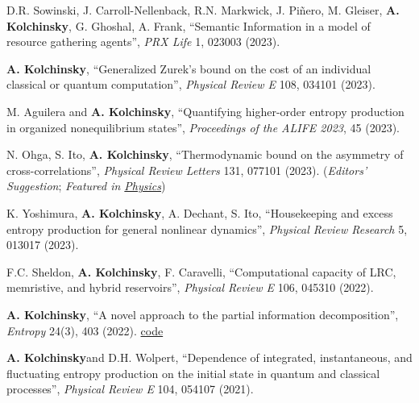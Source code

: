 D.R. Sowinski, J. Carroll-Nellenback, R.N. Markwick, J. Piñero, M. Gleiser, \textbf{A. Kolchinsky}, G. Ghoshal, A. Frank, ``Semantic Information in a model of resource gathering agents'', \emph{PRX Life} 1, 023003 (2023).  

\textbf{A. Kolchinsky}\CA, ``Generalized Zurek's bound on the cost of an individual classical or quantum computation'', \emph{Physical Review E} 108, 034101 (2023).  

M. Aguilera and \textbf{A. Kolchinsky}, ``Quantifying higher-order entropy production in organized nonequilibrium states'', \emph{Proceedings of the ALIFE 2023}, 45 (2023).  

N. Ohga, S. Ito, \textbf{A. Kolchinsky}, ``Thermodynamic bound on the asymmetry of cross-correlations'', \emph{Physical Review Letters} 131, 077101 (2023).   (\emph{Editors' Suggestion}; \emph{Featured in \href{https://physics.aps.org/articles/v16/142}{Physics}})

K. Yoshimura, \textbf{A. Kolchinsky}, A. Dechant, S. Ito, ``Housekeeping and excess entropy production for general nonlinear dynamics'', \emph{Physical Review Research}  5, 013017 (2023).  

F.C. Sheldon, \textbf{A. Kolchinsky}, F. Caravelli, ``Computational capacity of LRC, memristive, and hybrid reservoirs'', \emph{Physical Review E} 106, 045310 (2022).  

\textbf{A. Kolchinsky}, ``A novel approach to the partial information decomposition'', \emph{Entropy} 24(3), 403 (2022).  \href{https://github.com/artemyk/redundancy}{code} 

\textbf{A. Kolchinsky}\CA and D.H. Wolpert, ``Dependence of integrated, instantaneous, and fluctuating entropy production on the initial state in quantum and classical processes'', \emph{Physical Review E} 104, 054107 (2021).  

